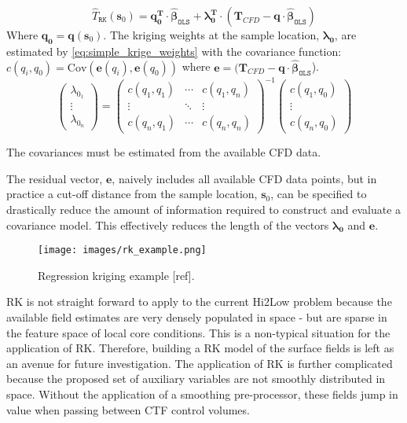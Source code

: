 \begin{equation}
\hat T_\mathtt{RK}(\mathbf{s}_0 ) = \mathbf{q}_\mathbf{0}^\mathbf{T} \cdot \mathbf{\hat \beta}_\mathtt{OLS} + \mathbf{\lambda }_\mathbf{0}^\mathbf{T} \cdot (\mathbf T_{CFD}
- \mathbf{q} \cdot \mathbf{\hat \beta }_\mathtt{OLS} )
\label{eq:rk_eval}
\end{equation}
Where $\mathbf{q}_\mathbf{0}= \mathbf{q}(\mathbf s_0)$. The kriging weights at the sample location, $\mathbf{\lambda_0}$, are estimated by \ref{eq:simple_krige_weights} with the covariance function: $c(q_i, q_0)= \mathrm{Cov}(\mathbf e(q_i), \mathbf e(q_0))$ where $\mathbf e = (\mathbf T_{CFD} - \mathbf{q} \cdot \mathbf{\hat \beta }_\mathtt{OLS}$). 
\begin{equation}
\begin{pmatrix}\lambda_{0_1} \\ \vdots \\ \lambda_{0_n} \end{pmatrix}=
\begin{pmatrix}c(q_1,q_1) & \cdots & c(q_1,q_n) \\
\vdots & \ddots & \vdots  \\
c(q_n,q_1) & \cdots & c(q_n,q_n) 
\end{pmatrix}^{-1}
\begin{pmatrix}c(q_1,q_0) \\ \vdots \\ c(q_n,q_0) \end{pmatrix}
\label{eq:simple_krige_weights}
\end{equation}

The covariances must be estimated from the available CFD data.  

The residual vector, $\mathbf e$, naively includes all available CFD data points, but in practice a cut-off distance from the sample location, $\mathbf s_0$, can be specified to drastically reduce the amount of information required to construct and evaluate a covariance model.  This effectively reduces the length of the vectors $\mathbf{\lambda_0}$ and $\mathbf e$.

\begin{figure}[hbtp]
\centering
\texttt{[image: images/rk\_example.png]}
\caption{Regression kriging example [ref].}
\label{fit:rk}
\end{figure}

RK is not straight forward to apply to the current Hi2Low problem because the available field estimates are very densely populated in space - but are sparse in the feature space of local core conditions. This is a non-typical situation for the application of RK. Therefore, building a RK model of the surface fields is left as an avenue for future investigation.
The application of RK is further complicated because the proposed set of auxiliary variables are not smoothly distributed in space.  Without the application of a smoothing pre-processor, these
fields jump in value when passing between CTF control volumes.

